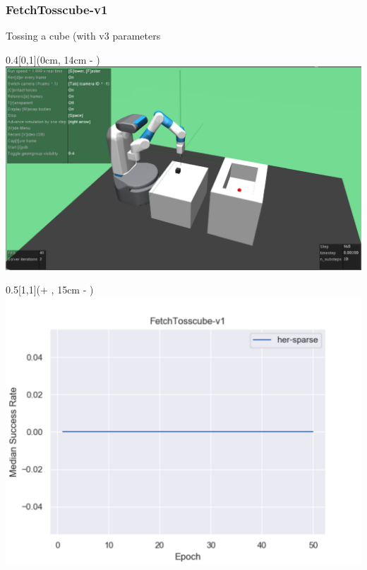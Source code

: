 \begin{frame}
	\frametitle{FetchTosscube-v1}	
	\vspace{1cm}
	
	Tossing a cube (with v3 parameters %
	
	\begin{textblock*}{0.4\paperwidth}[0,1](0cm, 14cm - \PraesentationSeitenrand)%
		\includegraphics[width=0.4\paperwidth]{./Ressourcen/Figures/FetchTosscube-v1.pdf}
	\end{textblock*}
	
	\begin{textblock*}{0.5\paperwidth}[1,1](\textwidth + \PraesentationSeitenrand, 15cm - \PraesentationSeitenrand)%
	    \includegraphics[width=0.5\paperwidth]{./Ressourcen/Figures/fig_FetchTosscube-v1.pdf}
	\end{textblock*}
	
\end{frame}
\clearpage


